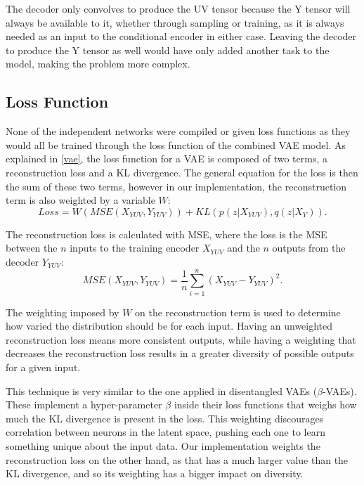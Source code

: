 \documentclass{l4proj}
\begin{document}
The decoder only convolves to produce the UV tensor because the Y tensor will always be available to it, whether through sampling or training, as it is always needed as an input to the conditional encoder in either case. Leaving the decoder to produce the Y tensor as well would have only added another task to the model, making the problem more complex.

\subsection{Loss Function}
None of the independent networks were compiled or given loss functions as they would all be trained through the loss function of the combined VAE model. As explained in \ref{vae}, the loss function for a VAE is composed of two terms, a reconstruction loss and a KL divergence. The general equation for the loss is then the sum of these two terms, however in our implementation, the reconstruction term is also weighted by a variable $W$:
\begin{equation}
    Loss =  W\left(MSE(X_{YUV}, Y_{YUV})\right) + KL\left(p(z|X_{YUV}),q(z|X_{Y})\right).
\end{equation}

The reconstruction loss is calculated with MSE, where the loss is the MSE between the $n$ inputs to the training encoder $X_{YUV}$ and the $n$ outputs from the decoder $Y_{YUV}$:
\begin{equation}
    MSE(X_{YUV}, Y_{YUV}) = \frac{1}{n}\sum_{i=1}^{n} (X_{YUV} - Y_{YUV})^2.
\end{equation}

The weighting imposed by $W$ on the reconstruction term is used to determine how varied the distribution should be for each input. Having an unweighted reconstruction loss means more consistent outputs, while having a weighting that decreases the reconstruction loss results in a greater diversity of possible outputs for a given input. 

This technique is very similar to the one applied in disentangled VAEs ($\beta$-VAEs). These implement a hyper-parameter $\beta$ inside their loss functions that weighs how much the KL divergence is present in the loss. This weighting discourages correlation between neurons in the latent space, pushing each one to learn something unique about the input data\cite{BetaVAE}. Our implementation weights the reconstruction loss on the other hand, as that has a much larger value than the KL divergence, and so its weighting has a bigger impact on diversity.
\end{document}
